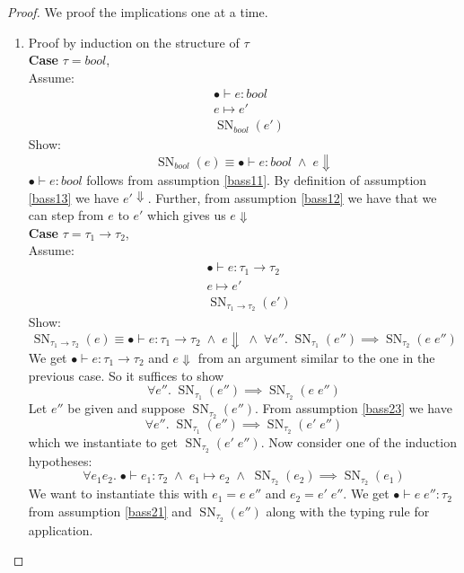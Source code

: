 \documentclass[a4paper,10pt,fleqn]{article}
\DeclareMathOperator{\SNPred}{SN}
\newcommand{\evalto}{\ensuremath{\mapsto}}
\newcommand{\mtenv}{\ensuremath{\bullet}}
\newcommand{\case}[1]{~\\{\bf Case} #1,~\\}
\newcommand{\tarrow}[2]{\ensuremath{ #1 \rightarrow #2}}
\newcommand{\SN}[2]{\ensuremath{\SNPred_{#1}(#2)}}
\newcommand{\pand}{\ensuremath{\; \wedge \;}}
\begin{document}
\begin{proof}
  We proof the implications one at a time.
  \begin{enumerate}
  \item Proof by induction on the structure of $\tau$ 
    \case{$\tau=bool$}
    Assume:
    \begin{align}
      &\mtenv \vdash e : bool \label{bass11}\\
      &e\evalto e' \label{bass12} \\
      &\SN{bool}{e'} \label{bass13}
    \end{align}
    Show:
    \[
    \SN{bool}{e} \equiv \mtenv \vdash e : bool \pand e \Downarrow
    \]
    $\mtenv \vdash e : bool$ follows from assumption \ref{bass11}. By definition of assumption \ref{bass13} we have $e' \Downarrow$. Further, from assumption \ref{bass12} we have that we can step from $e$ to $e'$ which gives us $e \Downarrow$
%
%
    \case{$\tau=\tarrow{\tau_1}{\tau_2}$} Assume:
    \begin{align}
      &\mtenv \vdash e : \tarrow{\tau_1}{\tau_2} \label{bass21}\\
      &e\evalto e' \label{bass22} \\
      &\SN{\tarrow{\tau_1}{\tau_2}}{e'} \label{bass23}
    \end{align}
    Show:
    \[
      \SN{\tarrow{\tau_1}{\tau_2}}{e} \equiv \mtenv \vdash e : \tarrow{\tau_1}{\tau_2} \pand e \Downarrow \pand \forall e''. \; \SN{\tau_1}{e''} \implies \SN{\tau_2}{e \; e''}
    \]
    We get $\mtenv \vdash e : \tarrow{\tau_1}{\tau_2}$ and $e \Downarrow$ from an argument similar to the one in the previous case. So it suffices to show
    \[
      \forall e''. \; \SN{\tau_1}{e''} \implies \SN{\tau_2}{e \; e''}
    \]
    Let $e''$ be given and suppose $\SN{\tau_2}{e''}$. From assumption \ref{bass23} we have 
    \[
      \forall e''. \; \SN{\tau_1}{e''} \implies \SN{\tau_2}{e' \; e''}
    \]
    which we instantiate to get $\SN{\tau_2}{e' \; e''}$. 
    Now consider one of the induction hypotheses:
    \[
    \forall e_1 e_2.\; \mtenv \vdash e_1 : \tau_2 \pand e_1 \evalto e_2 \pand \SN{\tau_2}{e_2} \implies \SN{\tau_2}{e_1}
    \]
    We want to instantiate this with $e_1 = e \; e''$ and $e_2 = e' \; e''$. We get $\mtenv \vdash e \; e'' : \tau_2$ from assumption \ref{bass21} and $\SN{\tau_2}{e''}$ along with the typing rule for application.
    \begin{comment}
      \[
      \inferrule*{\inferrule*{ (\ref{bass21}) }
        {\mtenv \vdash e : \tarrow{\tau_1}{\tau_2}}
        \and
        \inferrule*{ \SN{\tau_2}{e''} }

\end{comment}
\end{enumerate}
\end{proof}
\end{document}
